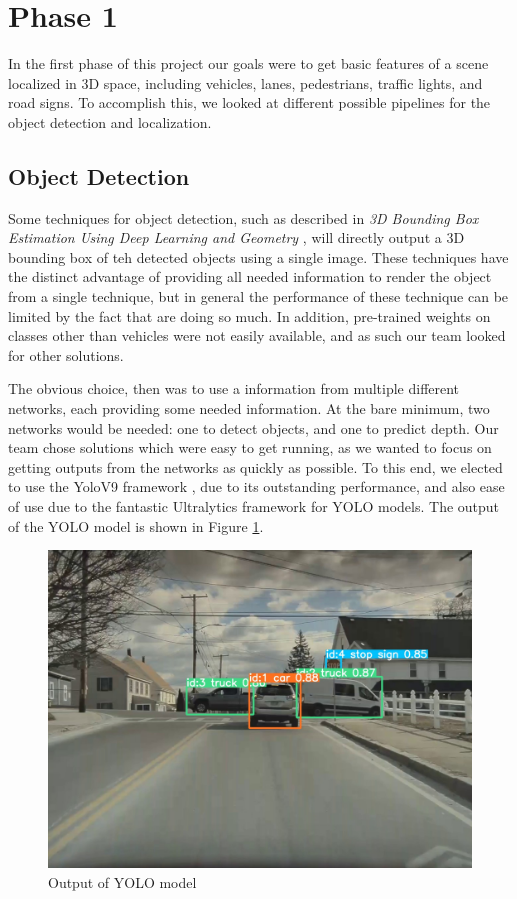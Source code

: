 \section{Phase 1}
In the first phase of this project our goals were to get basic features of a scene localized in 3D space, including vehicles, lanes, pedestrians, traffic lights, and road signs. To accomplish this, we looked at different possible pipelines for the object detection and localization.

\subsection{Object Detection}
Some techniques for object detection, such as described in \emph{3D Bounding Box Estimation Using Deep Learning and Geometry} \cite{3DBoxEstimation}, will directly output a 3D bounding box of teh detected objects using a single image. These techniques have the distinct advantage of providing all needed information to render the object from a single technique, but in general the performance of these technique can be limited by the fact that are doing so much. In addition, pre-trained weights on classes other than vehicles were not easily available, and as such our team looked for other solutions.

The obvious choice, then was to use a information from multiple different networks, each providing some needed information. At the bare minimum, two networks would be needed: one to detect objects, and one to predict depth. Our team chose solutions which were easy to get running, as we wanted to focus on getting outputs from the networks as quickly as possible. To this end, we elected to use the YoloV9 framework \cite{YOLOv9}, due to its outstanding performance, and also ease of use due to the fantastic Ultralytics framework for YOLO models. The output of the YOLO model is shown in Figure \ref{fig:yolo_output}.

\begin{figure}
    \centering
    \includegraphics[width=0.95\linewidth]{images/YOLOv9.jpg}
    \caption{Output of YOLO model}
    \label{fig:yolo_output}
\end{figure}

